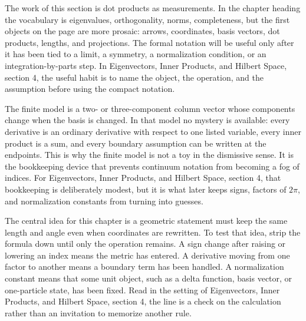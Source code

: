 











The work of this section is dot products as measurements.  In the chapter heading the vocabulary is eigenvalues, orthogonality, norms, completeness, but the first objects on the page are more prosaic: arrows, coordinates, basis vectors, dot products, lengths, and projections.  The formal notation will be useful only after it has been tied to a limit, a symmetry, a normalization condition, or an integration-by-parts step.  In Eigenvectors, Inner Products, and Hilbert Space, section 4, the useful habit is to name the object, the operation, and the assumption before using the compact notation.

The finite model is a two- or three-component column vector whose components change when the basis is changed.  In that model no mystery is available: every derivative is an ordinary derivative with respect to one listed variable, every inner product is a sum, and every boundary assumption can be written at the endpoints.  This is why the finite model is not a toy in the dismissive sense.  It is the bookkeeping device that prevents continuum notation from becoming a fog of indices.  For Eigenvectors, Inner Products, and Hilbert Space, section 4, that bookkeeping is deliberately modest, but it is what later keeps signs, factors of \(2\pi\), and normalization constants from turning into guesses.

The central idea for this chapter is a geometric statement must keep the same length and angle even when coordinates are rewritten.  To test that idea, strip the formula down until only the operation remains.  A sign change after raising or lowering an index means the metric has entered.  A derivative moving from one factor to another means a boundary term has been handled.  A normalization constant means that some unit object, such as a delta function, basis vector, or one-particle state, has been fixed.  Read in the setting of Eigenvectors, Inner Products, and Hilbert Space, section 4, the line is a check on the calculation rather than an invitation to memorize another rule.

